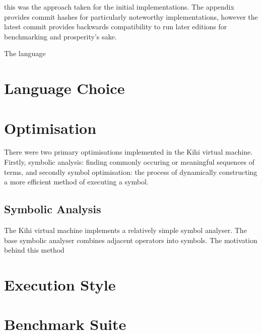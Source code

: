 this was the approach taken for the initial implementations. The appendix provides commit hashes for particularly noteworthy implementations, however the latest commit provides backwards compatibility to run later editions for benchmarking and prosperity's sake.

The language




\section{Language Choice}

\section{Optimisation}\label{sec:implementation_optimisation}
There were two primary optimisations implemented in the Kihi virtual
machine. Firstly, symbolic analysis: finding commonly occuring or
meaningful sequences of terms, and secondly symbol optimisation: the
process of dynamically constructing a more efficient method of executing
a symbol. 

\subsection{Symbolic Analysis}
The Kihi virtual machine implements a relatively simple symbol analyser.
The base symbolic analyser combines adjacent operators into symbols. The
motivation behind this method

\section{Execution Style}


\section{Benchmark Suite}


